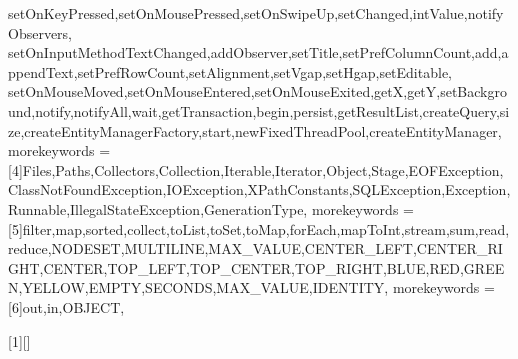 {{    setOnKeyPressed,setOnMousePressed,setOnSwipeUp,setChanged,intValue,notifyObservers, setOnInputMethodTextChanged,addObserver,setTitle,setPrefColumnCount,add,appendText,setPrefRowCount,setAlignment,setVgap,setHgap,setEditable,%
    setOnMouseMoved,setOnMouseEntered,setOnMouseExited,getX,getY,setBackground,notify,notifyAll,wait,getTransaction,begin,persist,getResultList,createQuery,size,createEntityManagerFactory,start,newFixedThreadPool,createEntityManager},
    morekeywords = [4]{Files,Paths,Collectors,Collection,Iterable,Iterator,Object,Stage,EOFException,ClassNotFoundException,IOException,XPathConstants,SQLException,Exception,Runnable,IllegalStateException,GenerationType},
    morekeywords = [5]{filter,map,sorted,collect,toList,toSet,toMap,forEach,mapToInt,stream,sum,read,reduce,NODESET,MULTILINE,MAX_VALUE,CENTER_LEFT,CENTER_RIGHT,CENTER,TOP_LEFT,TOP_CENTER,TOP_RIGHT,BLUE,RED,GREEN,YELLOW,EMPTY,SECONDS,MAX_VALUE,IDENTITY},
    morekeywords = [6]{out,in,OBJECT},
}


[1][]
  {\lstset{language=lJava,#1}}
{}



